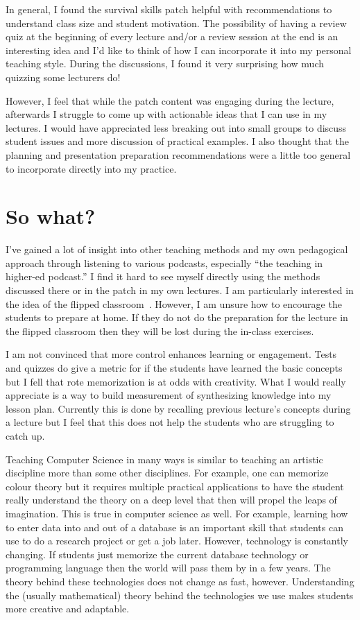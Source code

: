 \documentclass[
]{article}
\begin{document}
In general, I found the survival skills patch helpful with
recommendations to understand class size and student motivation. The
possibility of having a review quiz at the beginning of every lecture
and/or a review session at the end is an interesting idea and I'd like
to think of how I can incorporate it into my personal teaching style.
During the discussions, I found it very surprising how much quizzing
some lecturers do!

However, I feel that while the patch content was engaging during the
lecture, afterwards I struggle to come up with actionable ideas that I
can use in my lectures. I would have appreciated less breaking out into
small groups to discuss student issues and more discussion of practical
examples. I also thought that the planning and presentation preparation
recommendations were a little too general to incorporate directly into
my practice.

\hypertarget{so-what}{%
\section{So what?}\label{so-what}}

I've gained a lot of insight into other teaching methods and my own pedagogical
approach through listening to various podcasts, especially ``the teaching in
higher-ed podcast.'' I find it hard to see myself directly using the
methods discussed there or in the patch in my own lectures. I am particularly
interested in the idea of the flipped classroom~\cite{Abeysekera:2015}.
However, I am unsure how to encourage the students to prepare at home. If they
do not do the preparation for the lecture in the flipped classroom then they
will be lost during the in-class exercises.

I am not convinced that more control enhances learning or engagement.
Tests and quizzes do give a metric for if the students have learned the
basic concepts but I fell that rote memorization is at odds with
creativity. What I would really appreciate is a way to build measurement
of synthesizing knowledge into my lesson plan. Currently this
is done by recalling previous lecture's concepts during a lecture but I
feel that this does not help the students who are struggling to catch
up.

Teaching Computer Science in many ways is similar to teaching an
artistic discipline more than some other disciplines. For example, one
can memorize colour theory but it requires multiple practical
applications to have the student really understand the theory on a deep
level that then will propel the leaps of imagination. This is true in
computer science as well. For example, learning how to enter data into
and out of a database is an important skill that students can use to do
a research project or get a job later. However, technology is constantly
changing. If students just memorize the current database technology or
programming language then the world will pass them by in a few years.
The theory behind these technologies does not change as fast, however.
Understanding the (usually mathematical) theory behind the technologies
we use makes students more creative and adaptable.
\end{document}
